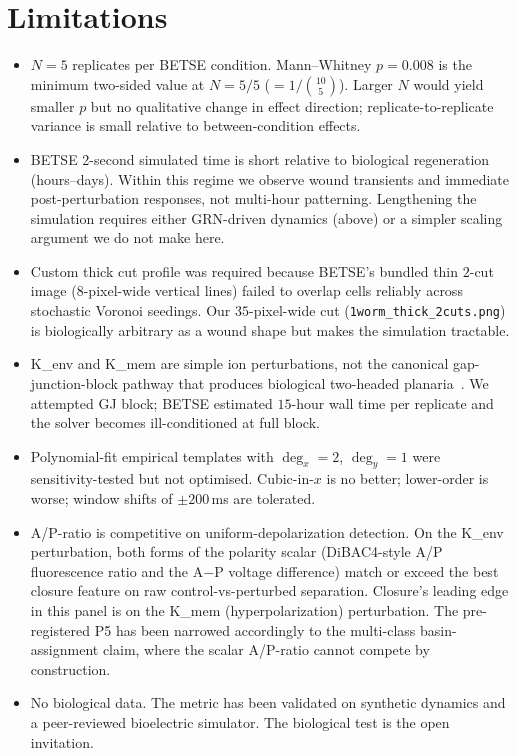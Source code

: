 \documentclass[11pt,a4paper]{article}
\begin{document}
\section{Limitations}\label{sec:limits}

\begin{itemize}\itemsep0pt
\item $N=5$ replicates per BETSE condition. Mann--Whitney $p=0.008$ is the minimum two-sided value at $N=5/5$ ($=1/\binom{10}{5}$). Larger $N$ would yield smaller $p$ but no qualitative change in effect direction; replicate-to-replicate variance is small relative to between-condition effects.
\item BETSE 2-second simulated time is short relative to biological regeneration (hours--days). Within this regime we observe wound transients and immediate post-perturbation responses, not multi-hour patterning. Lengthening the simulation requires either GRN-driven dynamics (above) or a simpler scaling argument we do not make here.
\item Custom thick cut profile was required because BETSE's bundled thin $2$-cut image ($8$-pixel-wide vertical lines) failed to overlap cells reliably across stochastic Voronoi seedings. Our $35$-pixel-wide cut (\texttt{1worm\_thick\_2cuts.png}) is biologically arbitrary as a wound shape but makes the simulation tractable.
\item K\_env and K\_mem are simple ion perturbations, not the canonical gap-junction-block pathway that produces biological two-headed planaria~\citep{beane2013bioelectric}. We attempted GJ block; BETSE estimated $15$-hour wall time per replicate and the solver becomes ill-conditioned at full block.
\item Polynomial-fit empirical templates with $\deg_{x}=2$, $\deg_{y}=1$ were sensitivity-tested but not optimised. Cubic-in-$x$ is no better; lower-order is worse; window shifts of $\pm 200$\,ms are tolerated.
\item A/P-ratio is competitive on uniform-depolarization detection. On the K\_env perturbation, both forms of the polarity scalar (DiBAC4-style A/P fluorescence ratio and the A$-$P voltage difference) match or exceed the best closure feature on raw control-vs-perturbed separation. Closure's leading edge in this panel is on the K\_mem (hyperpolarization) perturbation. The pre-registered P5 has been narrowed accordingly to the multi-class basin-assignment claim, where the scalar A/P-ratio cannot compete by construction.
\item No biological data. The metric has been validated on synthetic dynamics and a peer-reviewed bioelectric simulator. The biological test is the open invitation.
\end{itemize}
\end{document}
